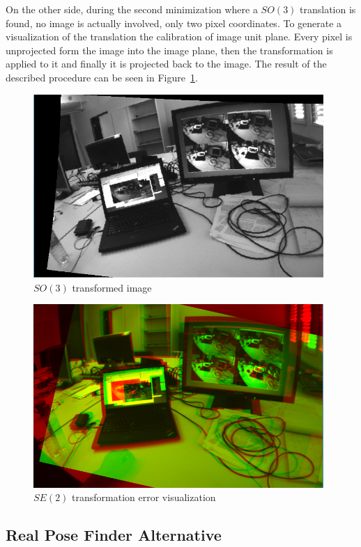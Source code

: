 On the other side, during the second minimization where a $SO(3)$ translation is found, no image is actually involved, only two pixel coordinates. To generate a visualization of the translation the calibration of image unit plane. Every pixel is unprojected form the image into the image plane, then the transformation is applied to it and finally it is projected back to the image. The result of the described procedure can be seen in Figure~\ref{fig:so3_transformation_1}.\\

\begin{figure}[htpb]
  \centering
  \includegraphics[width=11cm]{img/so3_transformation_1.png}
  \caption{$SO(3)$ transformed image}
  \label{fig:so3_transformation_1}
\end{figure}

\begin{figure}[htpb]
  \centering
  \includegraphics[width=11cm]{img/se2_error_1.png}
  \caption{$SE(2)$ transformation error visualization}
  \label{fig:se3_error_1}
\end{figure}


\subsection{Real Pose Finder Alternative}
\label{sub:real_pose_finder_alternative}

